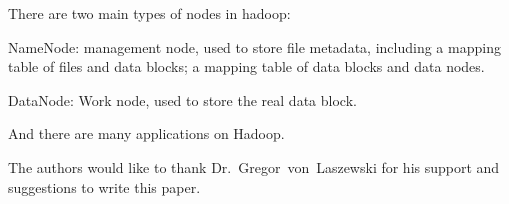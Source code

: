 There are two main types of nodes in hadoop:

NameNode: management node, used to store file metadata, including a mapping table of files and data blocks; a mapping table of data blocks and data nodes.

DataNode: Work node, used to store the real data block.

And there are many applications on Hadoop.

\begin{acks}

  The authors would like to thank Dr.~Gregor~von~Laszewski for his
  support and suggestions to write this paper.

\end{acks}


 


